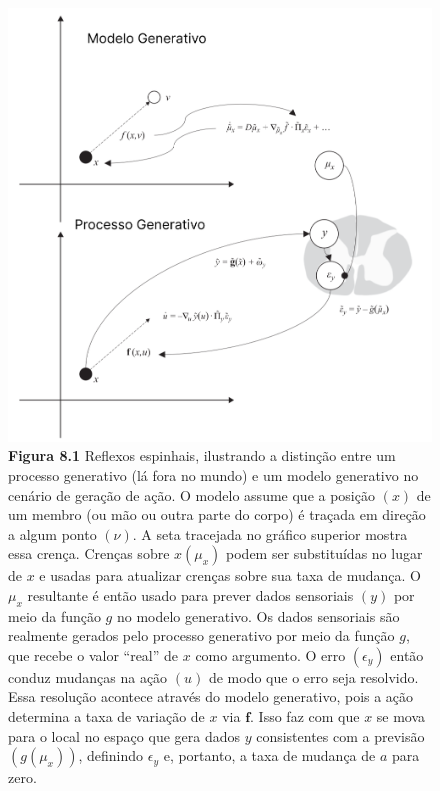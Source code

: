\documentclass[
  12pt,
]{book}
\begin{document}
\begin{figure}
\centering
\includegraphics{images/Figura_8_1.png}
\caption{\textbf{Figura 8.1} Reflexos espinhais, ilustrando a distinção entre um processo generativo (lá fora no mundo) e um modelo generativo no cenário de geração de ação. O modelo assume que a posição \((x)\) de um membro (ou mão ou outra parte do corpo) é traçada em direção a algum ponto \((\nu)\). A seta tracejada no gráfico superior mostra essa crença. Crenças sobre \(x(\mu_x)\) podem ser substituídas no lugar de \(x\) e usadas para atualizar crenças sobre sua taxa de mudança. O \(\mu_x\) resultante é então usado para prever dados sensoriais \((y)\) por meio da função \(g\) no modelo generativo. Os dados sensoriais são realmente gerados pelo processo generativo por meio da função \(g\), que recebe o valor ``real'' de \(x\) como argumento. O erro \((\epsilon_y)\) então conduz mudanças na ação \((u)\) de modo que o erro seja resolvido. Essa resolução acontece através do modelo generativo, pois a ação determina a taxa de variação de \(x\) via \(\pmb f\). Isso faz com que \(x\) se mova para o local no espaço que gera dados \(y\) consistentes com a previsão \((g(\mu_x))\), definindo \(\epsilon_y\) e, portanto, a taxa de mudança de \(a\) para zero.}
\end{figure}
\end{document}
